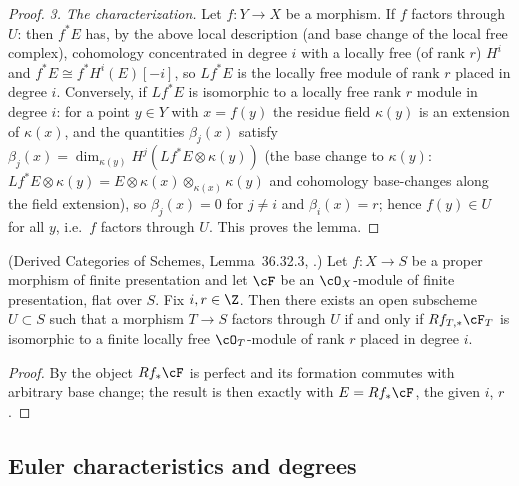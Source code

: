 \begin{proof}
\emph{3. The characterization.}  Let $f:Y\to X$ be a morphism.  If $f$
factors through $U$: then $f^*E$ has, by the above local description
(and base change of the local free complex), cohomology concentrated
in degree $i$ with a locally free (of rank $r$) $H^i$ and
$f^*E\cong f^*H^i(E)[-i]$, so $Lf^*E$ is the locally free module of
rank $r$ placed in degree $i$.
Conversely, if $Lf^*E$ is isomorphic to a locally free rank $r$ module
in degree $i$: for a point $y\in Y$ with $x=f(y)$ the residue field
$\kappa(y)$ is an extension of $\kappa(x)$, and the quantities
$\beta_j(x)$ satisfy
$\beta_j(x)=\dim_{\kappa(y)}H^j(Lf^*E\otimes\kappa(y))$ (the base
change to $\kappa(y)$: $Lf^*E\otimes\kappa(y)=E\otimes\kappa(x)\otimes_{\kappa(x)}\kappa(y)$
and cohomology base-changes along the field extension), so
$\beta_j(x)=0$ for $j\ne i$ and $\beta_i(x)=r$; hence $f(y)\in U$ for
all $y$, i.e.\ $f$ factors through $U$.  This proves the lemma.
\end{proof}


\begin{lemma}
\label{lem:pc-flat-rf-open}
(Derived Categories of Schemes, Lemma~36.32.3,
.)  Let
$f:X\to S$ be a proper morphism of finite presentation and let $\cF$ be an
$\cO_X$-module of finite presentation, flat over $S$.  Fix $i,r\in\Z$.
Then there exists an open subscheme $U\subset S$ such that a morphism
$T\to S$ factors through $U$ if and only if $Rf_{T,*}\cF_T$ is isomorphic
to a finite locally free $\cO_T$-module of rank $r$ placed in degree $i$.
\end{lemma}
\begin{proof}
By  the object $Rf_*\cF$ is perfect
and its formation commutes with arbitrary base change; the result is then
exactly  with $E=Rf_*\cF$, the given $i$, $r$.
\end{proof}

\subsection{Euler characteristics and degrees}

